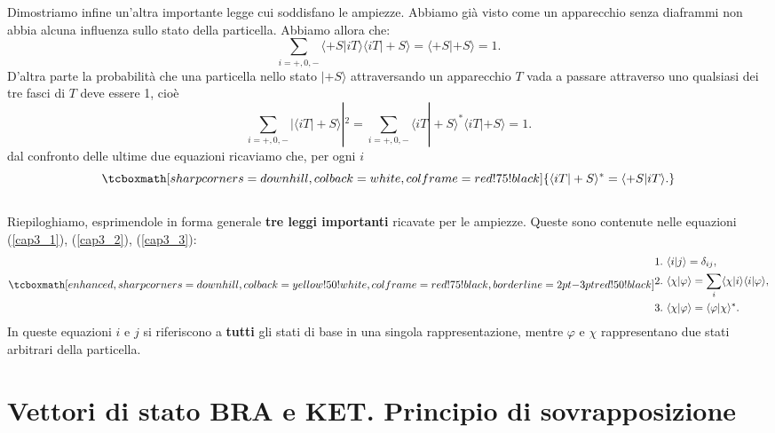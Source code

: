 \documentclass[a4paper,12pt,oneside]{book}
\begin{document}
Dimostriamo infine un'altra importante legge cui soddisfano le ampiezze. Abbiamo già visto come un apparecchio senza diaframmi non abbia alcuna influenza sullo stato della particella. Abbiamo allora che:
	\begin{equation}
	\sum \limits_{i=+,0,-}\langle +S | iT \rangle \langle iT | +S \rangle = \langle +S | +S \rangle =1 .
	\end{equation}
D'altra parte la probabilità che una particella nello stato $| +S \rangle$ attraversando un apparecchio $T$ vada a passare attraverso uno qualsiasi dei tre fasci di $T$ deve essere 1, cioè
	\begin{equation}
		\sum \limits_{i=+,0,-}|\langle iT | +S \rangle|^2= \sum \limits_{i=+,0,-} \langle iT | +S \rangle ^* \langle iT | +S \rangle= 1 .
	\end{equation}
dal confronto delle ultime due equazioni ricaviamo che, per ogni $i$
	\begin{equation}
 		\tcboxmath[sharp corners=downhill ,colback=white,colframe=red!75!black]{
 			\langle iT | +S \rangle ^* = \langle +S | iT \rangle .
 			}
	\label{cap3_3}
	\end{equation}\\

Riepiloghiamo, esprimendole in forma generale \textbf{tre leggi importanti} ricavate per le ampiezze.
Queste sono contenute nelle equazioni (\ref{cap3_1}), (\ref{cap3_2}), (\ref{cap3_3}):
	\begin{equation}
		\tcboxmath[enhanced,sharp corners=downhill ,colback=yellow!50!white,colframe=red!75!black, borderline={2pt}{-3pt}{red!50!black}]{
			\begin{aligned}
				&\textrm{1.}\ \langle i | j \rangle=\delta_{ij},\\
				&\textrm{2.}\ \langle \chi | \varphi \rangle=\sum \limits_{i} \langle \chi | i \rangle \langle i | \varphi \rangle,\\
				&\textrm{3.}\ \langle \chi | \varphi \rangle = \langle \varphi | \chi \rangle ^* .
			\end{aligned}
			}
	\end{equation}
In queste equazioni $i$ e $j$ si riferiscono a \textbf{tutti} gli stati di base in una singola rappresentazione, mentre $\varphi$ e $\chi$ rappresentano due stati arbitrari della particella.

\section[Principio di sovrapposizione]{Vettori di stato BRA e KET. Principio di sovrapposizione} 
\end{document}
